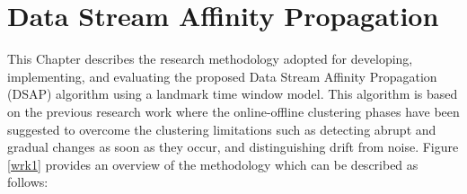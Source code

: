 \documentclass[../UNBThesis2.tex]{subfiles}
\begin{document}
\chapter{Data Stream Affinity Propagation}



This Chapter describes the research methodology adopted for developing, implementing, and evaluating the proposed Data Stream Affinity Propagation (DSAP) algorithm using a landmark time window model. This algorithm is based on the previous research work where the online-offline clustering phases have been suggested to overcome the clustering limitations such as detecting abrupt and gradual changes as soon as they occur, and distinguishing drift from noise. Figure \ref{wrk1} provides an overview of the methodology which can be described as follows:

\end{document}
